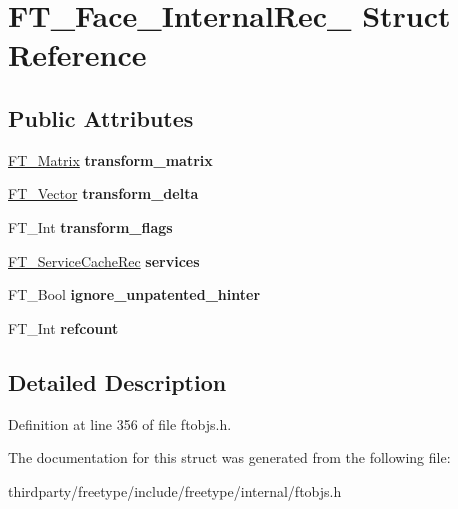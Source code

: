 \hypertarget{struct_f_t___face___internal_rec__}{}\section{F\+T\+\_\+\+Face\+\_\+\+Internal\+Rec\+\_\+ Struct Reference}
\label{struct_f_t___face___internal_rec__}
\subsection*{Public Attributes}
\begin{DoxyCompactItemize}
\item 
\mbox{\label{struct_f_t___face___internal_rec___ab4be2dcda098e6136f5701580d18032d}} 
\hyperlink{struct_f_t___matrix__}{F\+T\+\_\+\+Matrix} {\bfseries transform\+\_\+matrix}
\item 
\mbox{\label{struct_f_t___face___internal_rec___ab6c2aacdac58312273395b21b8d168c6}} 
\hyperlink{struct_f_t___vector__}{F\+T\+\_\+\+Vector} {\bfseries transform\+\_\+delta}
\item 
\mbox{\label{struct_f_t___face___internal_rec___a2495aced35040e1b7c2bc0afcd7a920d}} 
F\+T\+\_\+\+Int {\bfseries transform\+\_\+flags}
\item 
\mbox{\label{struct_f_t___face___internal_rec___abc3acb3bf5db056bb9c549af04f07963}} 
\hyperlink{struct_f_t___service_cache_rec__}{F\+T\+\_\+\+Service\+Cache\+Rec} {\bfseries services}
\item 
\mbox{\label{struct_f_t___face___internal_rec___af898fd754c36c3f34c9ce0e88eb101c9}} 
F\+T\+\_\+\+Bool {\bfseries ignore\+\_\+unpatented\+\_\+hinter}
\item 
\mbox{\label{struct_f_t___face___internal_rec___a353601751cba38cf1d4c2e700339190e}} 
F\+T\+\_\+\+Int {\bfseries refcount}
\end{DoxyCompactItemize}


\subsection{Detailed Description}


Definition at line 356 of file ftobjs.\+h.



The documentation for this struct was generated from the following file\+:\begin{DoxyCompactItemize}
\item 
thirdparty/freetype/include/freetype/internal/ftobjs.\+h\end{DoxyCompactItemize}

